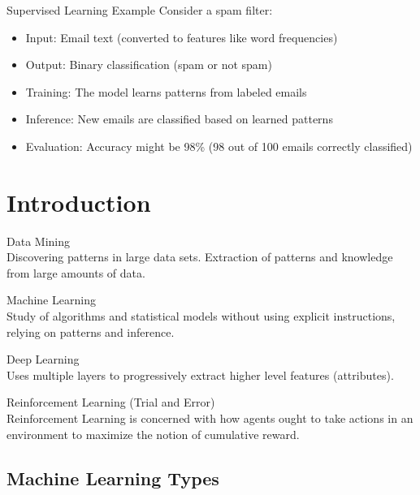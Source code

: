 \begin{example2}{Supervised Learning Example}
Consider a spam filter:
\begin{itemize}
    \item Input: Email text (converted to features like word frequencies)
    \item Output: Binary classification (spam or not spam)
    \item Training: The model learns patterns from labeled emails
    \item Inference: New emails are classified based on learned patterns
    \item Evaluation: Accuracy might be 98\% (98 out of 100 emails correctly classified)
\end{itemize}
\end{example2}

\section{Introduction}

\begin{definition}{Data Mining}\\
Discovering patterns in large data sets. Extraction of patterns and knowledge from large amounts of data.
\end{definition}

\begin{definition}{Machine Learning}\\
Study of algorithms and statistical models without using explicit instructions, relying on patterns and inference.
\end{definition}

\begin{definition}{Deep Learning}\\
Uses multiple layers to progressively extract higher level features (attributes).
\end{definition}

\begin{definition}{Reinforcement Learning (Trial and Error)}\\
Reinforcement Learning is concerned with how agents ought to take actions in an environment to maximize the notion of cumulative reward.
\end{definition}

\subsection{Machine Learning Types}

